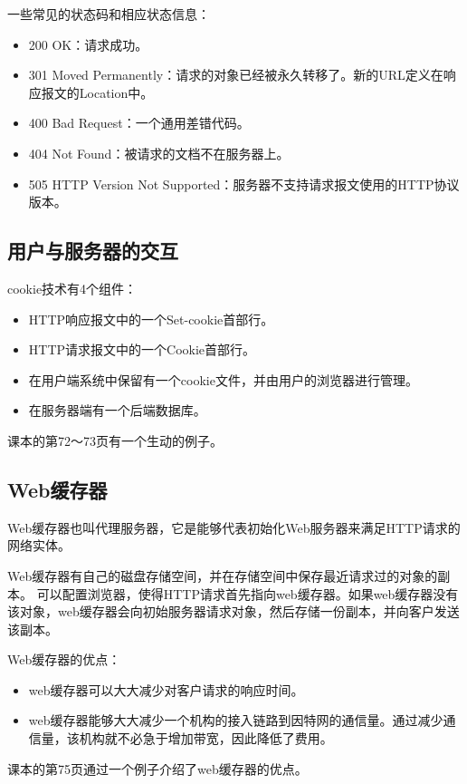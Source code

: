 \documentclass[a4paper,left=2.5cm,right=2.5cm,11pt]{article}
\begin{document}
	一些常见的状态码和相应状态信息：
	\begin{itemize}
		\item 200 OK：请求成功。
		\item 301 Moved Permanently：请求的对象已经被永久转移了。新的URL定义在响应报文的Location中。
		\item 400 Bad Request：一个通用差错代码。
		\item 404 Not Found：被请求的文档不在服务器上。
		\item 505 HTTP Version Not Supported：服务器不支持请求报文使用的HTTP协议版本。
	\end{itemize}

\subsection{用户与服务器的交互}
	cookie技术有4个组件：
	\begin{itemize}
		\item HTTP响应报文中的一个Set-cookie首部行。
		\item HTTP请求报文中的一个Cookie首部行。
		\item 在用户端系统中保留有一个cookie文件，并由用户的浏览器进行管理。
		\item 在服务器端有一个后端数据库。
	\end{itemize}

	课本的第72～73页有一个生动的例子。

\subsection{Web缓存器}
	Web缓存器也叫代理服务器，它是能够代表初始化Web服务器来满足HTTP请求的网络实体。\par

	Web缓存器有自己的磁盘存储空间，并在存储空间中保存最近请求过的对象的副本。
	可以配置浏览器，使得HTTP请求首先指向web缓存器。如果web缓存器没有该对象，web缓存器会向初始服务器请求对象，然后存储一份副本，并向客户发送该副本。\par

	Web缓存器的优点：
	\begin{itemize}
		\item web缓存器可以大大减少对客户请求的响应时间。
		\item web缓存器能够大大减少一个机构的接入链路到因特网的通信量。通过减少通信量，该机构就不必急于增加带宽，因此降低了费用。
	\end{itemize}

	课本的第75页通过一个例子介绍了web缓存器的优点。
\end{document}
